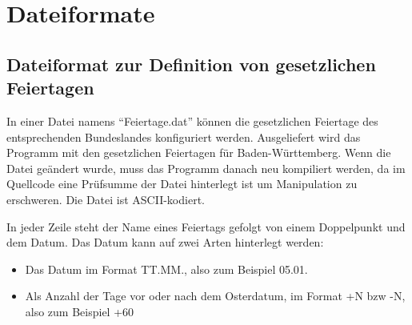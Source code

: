 \section{Dateiformate}
\subsection{Dateiformat zur Definition von gesetzlichen Feiertagen}
In einer Datei namens "`Feiertage.dat"' können die gesetzlichen Feiertage des entsprechenden Bundeslandes konfiguriert werden.
Ausgeliefert wird das Programm mit den gesetzlichen Feiertagen für Baden-Württemberg.
Wenn die Datei geändert wurde, muss das Programm danach neu kompiliert werden, da im Quellcode eine Prüfsumme der Datei hinterlegt ist um Manipulation zu erschweren.
Die Datei ist ASCII-kodiert.

In jeder Zeile steht der Name eines Feiertags gefolgt von einem Doppelpunkt und dem Datum.
Das Datum kann auf zwei Arten hinterlegt werden:
\begin{itemize}
    \item Das Datum im Format TT.MM., also zum Beispiel 05.01.
    \item Als Anzahl der Tage vor oder nach dem Osterdatum, im Format +N bzw -N, also zum Beispiel +60
\end{itemize}
